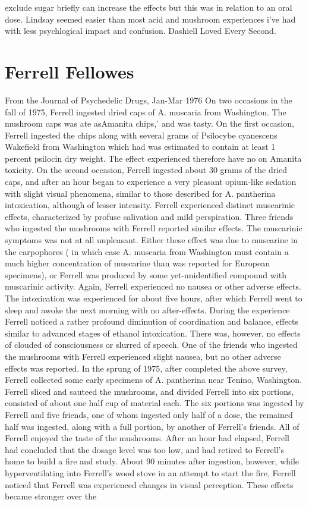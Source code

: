 \documentclass[12pt]{book}
\begin{document}
exclude sugar briefly can increase the effects but this was in relation to an oral dose. Lindsay seemed easier than most acid and mushroom experiences i've had with less psychlogical impact and confusion. Dashiell Loved Every Second.



\chapter{Ferrell Fellowes}

From the Journal of Psychedelic Drugs, Jan-Mar 1976 On two occasions in the fall of 1975, Ferrell ingested dried caps of A. muscaria from Washington. The mushroom caps was ate asAmanita chips,' and was tasty. On the first occasion, Ferrell ingested the chips along with several grams of Psilocybe cyanescens Wakefield from Washington which had was estimated to contain at least 1 percent psilocin dry weight. The effect experienced therefore have no  on Amanita toxicity. On the second occasion, Ferrell ingested about 30 grams of the dried caps, and after an hour began to experience a very pleasant opium-like sedation with slight visual phenomena, similar to those described for A. pantherina intoxication, although of lesser intensity. Ferrell experienced distinct muscarinic effects, characterized by profuse salivation and mild perspiration. Three friends who ingested the mushrooms with Ferrell reported similar effects. The muscarinic symptoms was not at all unpleasant. Either these effect was due to muscarine in the carpophores ( in which case A. muscaria from Washington must contain a much higher concentration of muscarine than was reported for European specimens), or Ferrell was produced by some yet-unidentified compound with muscarinic activity. Again, Ferrell experienced no nausea or other adverse effects. The intoxication was experienced for about five hours, after which Ferrell went to sleep and awoke the next morning with no after-effects. During the experience Ferrell noticed a rather profound diminution of coordination and balance, effects similar to advanced stages of ethanol intoxication. There was, however, no effects of clouded of consciousness or slurred of speech. One of the friends who ingested the mushrooms with Ferrell experienced slight nausea, but no other adverse effects was reported. In the sprung of 1975, after completed the above survey, Ferrell collected some early specimens of A. pantherina near Tenino, Washington. Ferrell sliced and sauteed the mushrooms, and divided Ferrell into six portions, consisted of about one half cup of material each. The six portions was ingested by Ferrell and five friends, one of whom ingested only half of a dose, the remained half was ingested, along with a full portion, by another of Ferrell's friends. All of Ferrell enjoyed the taste of the mushrooms. After an hour had elapsed, Ferrell had concluded that the dosage level was too low, and had retired to Ferrell's home to build a fire and study. About 90 minutes after ingestion, however, while hyperventilating into Ferrell's wood stove in an attempt to start the fire, Ferrell noticed that Ferrell was experienced changes in visual perception. These effects became stronger over the 
\end{document}
